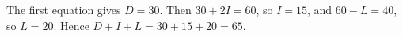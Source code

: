 The first equation gives $D=30$. Then $30+2I=60$, so $I=15$, and $60-L=40$, so $L=20$. Hence $D+I+L=30+15+20=\boxed{65}$.
